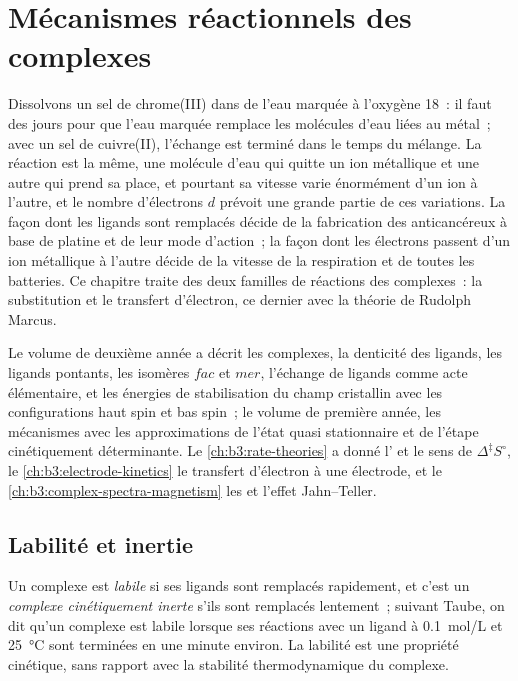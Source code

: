 \chapter{Mécanismes réactionnels des complexes}\label{ch:b3:complex-mechanisms}

Dissolvons un sel de chrome(III) dans de l'eau marquée à l'oxygène 18~: il
faut des jours pour que l'eau marquée remplace les molécules d'eau liées au
métal~; avec un sel de cuivre(II), l'échange est terminé dans le temps du
mélange. La réaction est la même, une molécule d'eau qui quitte un ion
métallique et une autre qui prend sa place, et pourtant sa vitesse varie
énormément d'un ion à l'autre, et le nombre d'électrons $d$ prévoit une
grande partie de ces variations. La façon dont les ligands sont remplacés
décide de la fabrication des anticancéreux à base de platine et de leur
mode d'action~; la façon dont les électrons passent d'un ion métallique à
l'autre décide de la vitesse de la respiration et de toutes les batteries.
Ce chapitre traite des deux familles de réactions des complexes~: la
substitution et le transfert d'électron, ce dernier avec la théorie de
Rudolph Marcus.

\begin{recall}
Le volume de deuxième année a décrit les complexes, la denticité des
ligands, les ligands pontants, les isomères $fac$ et $mer$, l'échange de
ligands comme acte élémentaire, et les énergies de stabilisation du champ
cristallin avec les configurations haut spin et bas spin~; le volume de
première année, les mécanismes avec les approximations de l'état quasi
stationnaire et de l'étape cinétiquement déterminante. Le
\cref{ch:b3:rate-theories} a donné l' et le sens de
$\Delta^{\ddagger}S^\circ$, le \cref{ch:b3:electrode-kinetics} le transfert
d'électron à une électrode, et le \cref{ch:b3:complex-spectra-magnetism} les
 et l'effet Jahn--Teller.
\end{recall}

\section{Labilité et inertie}

\begin{definition}\label{def:b3:complex-mechanisms:labile}
Un complexe est \emph{labile} si ses ligands sont
remplacés rapidement, et c'est un \emph{complexe cinétiquement inerte}
s'ils sont remplacés lentement~; suivant Taube, on dit qu'un complexe est
labile lorsque ses réactions avec un ligand à \qty{0.1}{mol/L} et
\qty{25}{\celsius} sont terminées en une minute environ. La labilité est
une propriété cinétique, sans rapport avec la stabilité thermodynamique du
complexe.
\end{definition}

